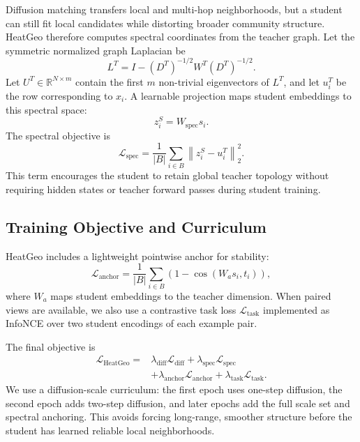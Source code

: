 Diffusion matching transfers local and multi-hop neighborhoods, but a student can still fit local candidates while distorting broader community structure. HeatGeo therefore computes spectral coordinates from the teacher graph. Let the symmetric normalized graph Laplacian be
\begin{equation}
    L^T = I - (D^T)^{-1/2}W^T(D^T)^{-1/2}.
\end{equation}
Let $U^T\in\mathbb{R}^{N\times m}$ contain the first $m$ non-trivial eigenvectors of $L^T$, and let $u_i^T$ be the row corresponding to $x_i$. A learnable projection maps student embeddings to this spectral space:
\begin{equation}
    z_i^S = W_{\mathrm{spec}}s_i.
\end{equation}
The spectral objective is
\begin{equation}
    \mathcal{L}_{\mathrm{spec}}
    =
    \frac{1}{|B|}
    \sum_{i\in B}
    \left\|
    z_i^S-u_i^T
    \right\|_2^2.
\end{equation}
This term encourages the student to retain global teacher topology without requiring hidden states or teacher forward passes during student training.

\subsection{Training Objective and Curriculum}

HeatGeo includes a lightweight pointwise anchor for stability:
\begin{equation}
    \mathcal{L}_{\mathrm{anchor}}
    =
    \frac{1}{|B|}
    \sum_{i\in B}
    \left(1-\cos(W_a s_i,t_i)\right),
\end{equation}
where $W_a$ maps student embeddings to the teacher dimension. When paired views are available, we also use a contrastive task loss $\mathcal{L}_{\mathrm{task}}$ implemented as InfoNCE over two student encodings of each example pair.

The final objective is
\begin{equation}
\begin{aligned}
    \mathcal{L}_{\mathrm{HeatGeo}}
    ={}&
    \lambda_{\mathrm{diff}}\mathcal{L}_{\mathrm{diff}}
    +
    \lambda_{\mathrm{spec}}\mathcal{L}_{\mathrm{spec}}
    \\
    &+
    \lambda_{\mathrm{anchor}}\mathcal{L}_{\mathrm{anchor}}
    +
    \lambda_{\mathrm{task}}\mathcal{L}_{\mathrm{task}}.
\end{aligned}
\end{equation}
We use a diffusion-scale curriculum: the first epoch uses one-step diffusion, the second epoch adds two-step diffusion, and later epochs add the full scale set and spectral anchoring. This avoids forcing long-range, smoother structure before the student has learned reliable local neighborhoods.

